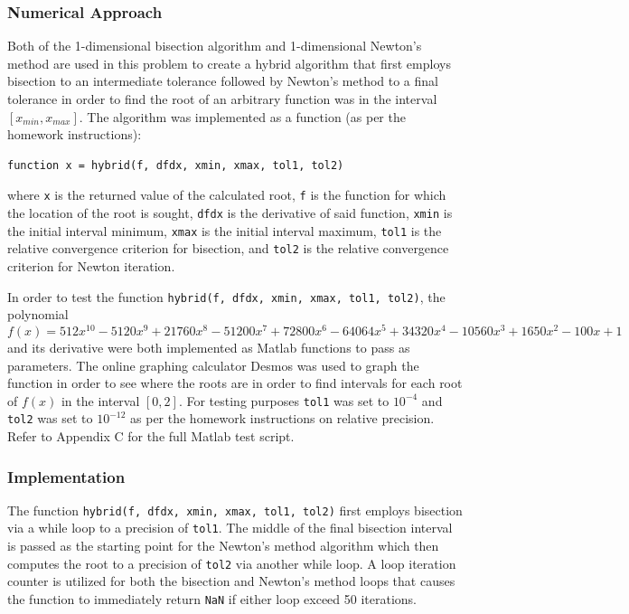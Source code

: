 \documentclass[10pt]{article}
\def\code#1{\texttt{#1}}
\begin{document}
\subsubsection*{Numerical Approach}

Both of the 1-dimensional bisection algorithm and 1-dimensional Newton's method are used in this problem to 
create a hybrid algorithm that first employs bisection to an intermediate tolerance followed by Newton's method to
a final tolerance in order to find the root of an arbitrary function was in the interval $[x_{min}, x_{max}]$.
The algorithm was implemented as a function (as per the homework instructions):
\begin{verbatim}
function x = hybrid(f, dfdx, xmin, xmax, tol1, tol2)
\end{verbatim}
where \code{x} is the returned value of the calculated root, \code{f} is the function for which the location
of the root is sought, \code{dfdx} is the derivative of said function, \code{xmin} is the initial interval 
minimum, \code{xmax} is the initial interval maximum, \code{tol1} is the relative convergence criterion for
bisection, and \code{tol2} is the relative convergence criterion for Newton iteration.

In order to test the function \code{hybrid(f, dfdx, xmin, xmax, tol1, tol2)}, the polynomial 
$$f(x) = 512x^{10}-5120x^9 + 21760x^8-51200x^7 + 72800x^6-64064x^5 + 34320x^4-10560x^3 + 1650x^2-100x + 1$$
and its derivative were both implemented as Matlab functions to pass as parameters. The online graphing 
calculator Desmos was used to graph the function in order to see where the roots are in order to find intervals
for each root of $f(x)$ in the interval $[0,2]$. For testing purposes \code{tol1} was set to $10^{-4}$ and 
\code{tol2} was set to $10^{-12}$ as per the homework instructions on relative precision. Refer to Appendix C 
for the full Matlab test script. 

\subsubsection*{Implementation}

The function \code{hybrid(f, dfdx, xmin, xmax, tol1, tol2)} first employs bisection via a while loop to a 
precision of \code{tol1}. The middle of the final bisection interval is passed as the starting point for the 
Newton's method algorithm which then computes the root to a precision of \code{tol2} via another while loop. 
A loop iteration counter is utilized for both the bisection and Newton's method loops that causes the function
to immediately return \code{NaN} if either loop exceed 50 iterations.
\end{document}
